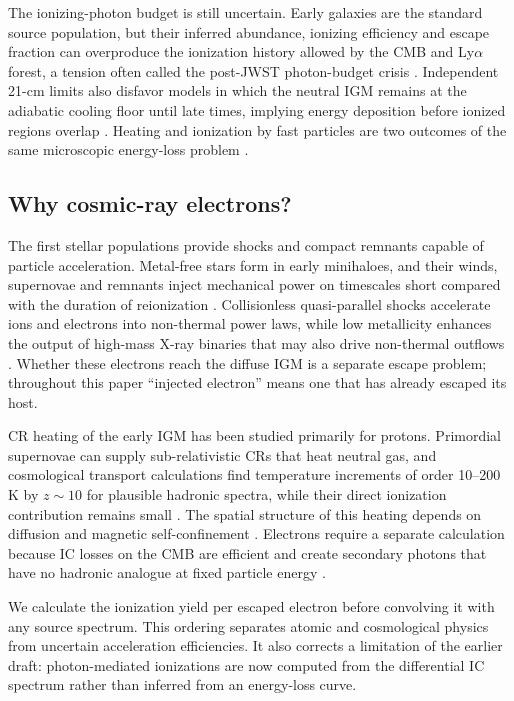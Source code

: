 \documentclass[10pt,twocolumn]{article}
\begin{document}
The ionizing-photon budget is still uncertain. Early galaxies are the standard
source population, but their inferred abundance, ionizing efficiency and
escape fraction can overproduce the ionization history allowed by the CMB and
Ly$\alpha$ forest, a tension often called the post-JWST photon-budget crisis
\citep{Robertson2022,Munoz2024}. Independent 21-cm limits also disfavor models
in which the neutral IGM remains at the adiabatic cooling floor until late
times, implying energy deposition before ionized regions overlap
\citep{HERA2023}. Heating and ionization by fast particles are two outcomes of
the same microscopic energy-loss problem \citep{Furlanetto2010}.

\subsection{Why cosmic-ray electrons?}

The first stellar populations provide shocks and compact remnants capable of
particle acceleration. Metal-free stars form in early minihaloes, and their
winds, supernovae and remnants inject mechanical power on timescales short
compared with the duration of reionization \citep{Klessen2023,Owen2017}.
Collisionless quasi-parallel shocks accelerate ions and electrons into
non-thermal power laws, while low metallicity enhances the output of high-mass
X-ray binaries that may also drive non-thermal outflows
\citep{Park2015,Kaur2022}. Whether these electrons reach the diffuse IGM is a
separate escape problem; throughout this paper ``injected electron'' means one
that has already escaped its host.

CR heating of the early IGM has been studied primarily for protons. Primordial
supernovae can supply sub-relativistic CRs that heat neutral gas, and
cosmological transport calculations find temperature increments of order
10--200 K by $z\sim10$ for plausible hadronic spectra, while their direct
ionization contribution remains small \citep{Sazonov2015,Leite2017}. The
spatial structure of this heating depends on diffusion and magnetic
self-confinement \citep{Jana2018,GesseyJones2023}. Electrons require a separate
calculation because IC losses on the CMB are efficient and create secondary
photons that have no hadronic analogue at fixed particle energy
\citep{Blumenthal1970,Slatyer2009}.

We calculate the ionization yield per escaped electron before convolving it
with any source spectrum. This ordering separates atomic and cosmological
physics from uncertain acceleration efficiencies. It also corrects a
limitation of the earlier draft: photon-mediated ionizations are now computed
from the differential IC spectrum rather than inferred from an energy-loss
curve.
\end{document}
